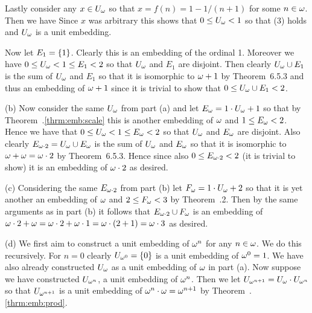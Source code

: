 \begin{solution}
    Lastly consider any $x \in U_\omega$ so that $x = f(n) = 1 - 1/(n+1)$ for some $n \in \omega$.
    Then we have
    Since $x$ was arbitrary this shows that $0 \leq U_\omega < 1$ so that (3) holds and $U_\omega$ is a unit embedding.

    Now let $E_1 = \left\{ 1 \right\}$.
    Clearly this is an embedding of the ordinal 1.
    Moreover we have $0 \leq U_\omega < 1 \leq E_1 < 2$ so that $U_\omega$ and $E_1$ are disjoint.
    Then clearly $U_\omega \cup E_1$ is the sum of $U_\omega$ and $E_1$ so that it is isomorphic to $\omega + 1$ by Theorem~6.5.3 and thus an embedding of $\omega + 1$ since it is trivial to show that $0 \leq U_\omega \cup E_1 < 2$.

    (b) Now consider the same $U_\omega$ from part (a) and let $E_\omega = 1 \cdot U_\omega + 1$ so that by Theorem~\ex.\ref{thrm:emb:scale} this is another embedding of $\omega$ and $1 \leq E_\omega < 2$.
    Hence we have that $0 \leq U_\omega < 1 \leq E_\omega < 2$ so that $U_\omega$ and $E_\omega$ are disjoint.
    Also clearly $E_{\omega \cdot 2} = U_\omega \cup E_\omega$ is the sum of $U_\omega$ and $E_\omega$ so that it is isomorphic to $\omega + \omega = \omega \cdot 2$ by Theorem~6.5.3.
    Hence since also $0 \leq E_{\omega \cdot 2} < 2$ (it is trivial to show) it is an embedding of $\omega \cdot 2$ as desired.

    (c) Considering the same $E_{\omega \cdot 2}$ from part (b) let $F_\omega = 1 \cdot U_\omega + 2$ so that it is yet another an embedding of $\omega$ and $2 \leq F_\omega < 3$ by Theorem~\ex.2.
    Then by the same arguments as in part (b) it follows that $E_{\omega \cdot 2} \cup F_\omega$ is an embedding of $\omega \cdot 2 + \omega = \omega \cdot 2 + \omega \cdot 1 = \omega \cdot (2 + 1) = \omega \cdot 3$ as desired.

    \def\Uww{U_{\w^\w}}
    (d) We first aim to construct a unit embedding of $\omega^n$ for any $n \in \omega$.
    We do this recursively.
    For $n=0$ clearly $U_{\omega^0} = \left\{ 0 \right\}$ is a unit embedding of $\omega^0 = 1$.
    We have also already constructed $U_\omega$ as a unit embedding of $\omega$ in part (a).
    Now suppose we have constructed $U_{\omega^n}$, a unit embedding of $\omega^n$.
    Then we let $U_{\omega^{n+1}} = U_\omega \cdot U_{\omega^n}$ so that $U_{\omega^{n+1}}$ is a unit embedding of $\omega^n \cdot \omega = \omega^{n+1}$ by Theorem~\ex.\ref{thrm:emb:prod}.


\end{solution}
